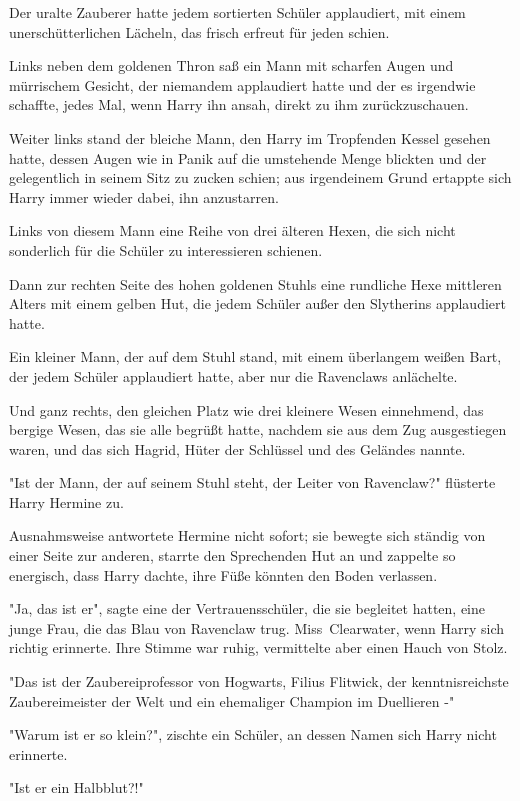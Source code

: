 {Der uralte Zauberer hatte jedem sortierten Schüler applaudiert, mit einem unerschütterlichen Lächeln, das frisch erfreut für jeden schien.

Links neben dem goldenen Thron saß ein Mann mit scharfen Augen und mürrischem Gesicht, der niemandem applaudiert hatte und der es irgendwie schaffte, jedes Mal, wenn Harry ihn ansah, direkt zu ihm zurückzuschauen.

Weiter links stand der bleiche Mann, den Harry im Tropfenden Kessel gesehen hatte, dessen Augen wie in Panik auf die umstehende Menge blickten und der gelegentlich in seinem Sitz zu zucken schien; aus irgendeinem Grund ertappte sich Harry immer wieder dabei, ihn anzustarren.

Links von diesem Mann eine Reihe von drei älteren Hexen, die sich nicht sonderlich für die Schüler zu interessieren schienen.

Dann zur rechten Seite des hohen goldenen Stuhls eine rundliche Hexe mittleren Alters mit einem gelben Hut, die jedem Schüler außer den Slytherins applaudiert hatte.

Ein kleiner Mann, der auf dem Stuhl stand, mit einem überlangem weißen Bart, der jedem Schüler applaudiert hatte, aber nur die Ravenclaws anlächelte.

Und ganz rechts, den gleichen Platz wie drei kleinere Wesen einnehmend, das bergige Wesen, das sie alle begrüßt hatte, nachdem sie aus dem Zug ausgestiegen waren, und das sich Hagrid, Hüter der Schlüssel und des Geländes nannte.

"Ist der Mann, der auf seinem Stuhl steht, der Leiter von Ravenclaw?" flüsterte Harry Hermine zu.

Ausnahmsweise antwortete Hermine nicht sofort; sie bewegte sich ständig von einer Seite zur anderen, starrte den Sprechenden Hut an und zappelte so energisch, dass Harry dachte, ihre Füße könnten den Boden verlassen.

"Ja, das ist er", sagte eine der Vertrauensschüler, die sie begleitet hatten, eine junge Frau, die das Blau von Ravenclaw trug. Miss~Clearwater, wenn Harry sich richtig erinnerte. Ihre Stimme war ruhig, vermittelte aber einen Hauch von Stolz.

"Das ist der Zaubereiprofessor von Hogwarts, Filius Flitwick, der kenntnisreichste Zaubereimeister der Welt und ein ehemaliger Champion im Duellieren -"

"Warum ist er so klein?", zischte ein Schüler, an dessen Namen sich Harry nicht erinnerte.

"Ist er ein Halbblut?!"

}
